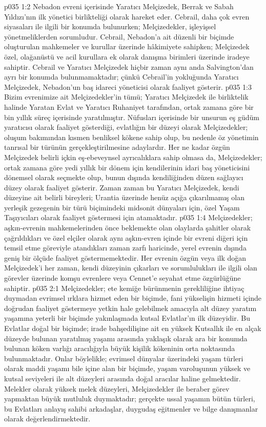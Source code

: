\vs p035 1:2 Nebadon evreni içerisinde Yaratıcı Melçizedek, Berrak ve Sabah Yıldızı’nın ilk yönetici birlikteliği olarak hareket eder. Cebrail, daha çok evren siyasaları ile ilgili bir konumda bulunurken; Melçizedekler, işleyişsel yönetmeliklerden sorumludur. Cebrail, Nebadon’a ait düzenli bir biçimde oluşturulan mahkemeler ve kurullar üzerinde hâkimiyete sahipken; Melçizedek özel, olağanüstü ve acil kurullara ek olarak danışma birimleri üzerinde iradeye sahiptir. Cebrail ve Yaratıcı Melçizedek hiçbir zaman aynı anda Salvington’dan ayrı bir konumda bulunmamaktadır; çünkü Cebrail’in yokluğunda Yaratıcı Melçizedek, Nebadon’un baş idareci yöneticisi olarak faaliyet gösterir.
\vs p035 1:3 Bizim evrenimize ait Melçizedekler’in tümü; Yaratıcı Melçizedek ile birliktelik halinde Yaratan Evlat ve Yaratıcı Ruhaniyet tarafından, ortak zamana göre bir bin yıllık süreç içerisinde yaratılmıştır. Nüfusları içerisinde bir unsurun eş güdüm yaratıcısı olarak faaliyet gösterdiği, evlatlığın bir düzeyi olarak Melçizedekler; oluşum bakımından kısmen benliksel kökene sahip olup, bu nedenle öz yönetimin tanrısal bir türünün gerçekleştirilmesine adaylardır. Her ne kadar özgün Melçizedek belirli içkin eş\hyp{}ebeveynsel ayrıcalıklara sahip olmasa da, Melçizedekler; ortak zamana göre yedi yıllık bir dönem için kendilerinin idari baş yöneticisini dönemsel olarak seçmekte olup, bunun dışında kendiliğinden düzen sağlayıcı düzey olarak faaliyet gösterir. Zaman zaman bu Yaratıcı Melçizedek, kendi düzeyine ait belirli bireyleri; Urantia üzerinde henüz açığa çıkarılmamış olan yerleşik gezegenin bir türü biçimindeki midsonit dünyaları için, özel Yaşam Taşıyıcıları olarak faaliyet göstermesi için atamaktadır.
\vs p035 1:4 Melçizedekler; aşkın\hyp{}evrenin mahkemelerinden önce beklemekte olan olaylarda şahitler olarak çağrıldıkları ve özel elçiler olarak aynı aşkın\hyp{}evren içinde bir evreni diğeri için temsil etme göreviyle atandıkları zaman zarfı haricinde, yerel evrenin dışında geniş bir ölçüde faaliyet göstermemektedir. Her evrenin özgün veya ilk doğan Melçizedek’i her zaman, kendi düzeyinin çıkarları ve sorumlulukları ile ilgili olan görevler üzerinde komşu evrenlere veya Cennet’e seyahat etme özgürlüğüne sahiptir.
\vs p035 2:1 Melçizedekler; ete kemiğe bürünmenin gerekliliğine ihtiyaç duymadan evrimsel ırklara hizmet eden bir biçimde, fani yükselişin hizmeti içinde doğrudan faaliyet göstermeye yetkin hale gelebilmek amacıyla alt düzey yaratım yaşamına yeterli bir biçimde yakınlaşmada kutsal Evlatlar’ın ilk düzeyidir. Bu Evlatlar doğal bir biçimde; irade bahşedilişine ait en yüksek Kutsallık ile en alçak düzeyde bulunan yaratılmış yaşamı arasında yaklaşık olarak ara bir konumda bulunan köken varlığı aracılığıyla büyük kişilik kökeninin orta noktasında bulunmaktadır. Onlar böylelikle; evrimsel dünyalar üzerindeki yaşam türleri olarak maddi yaşamı bile içine alan bir biçimde, yaşam varoluşunun yüksek ve kutsal seviyeleri ile alt düzeyleri arasında doğal aracılar haline gelmektedir. Melekler olarak yüksek melek düzeyleri, Melçizedekler ile beraber görev yapmaktan büyük mutluluk duymaktadır; gerçekte ussal yaşamın bütün türleri, bu Evlatları anlayış sahibi arkadaşlar, duygudaş eğitmenler ve bilge danışmanlar olarak değerlendirmektedir.
